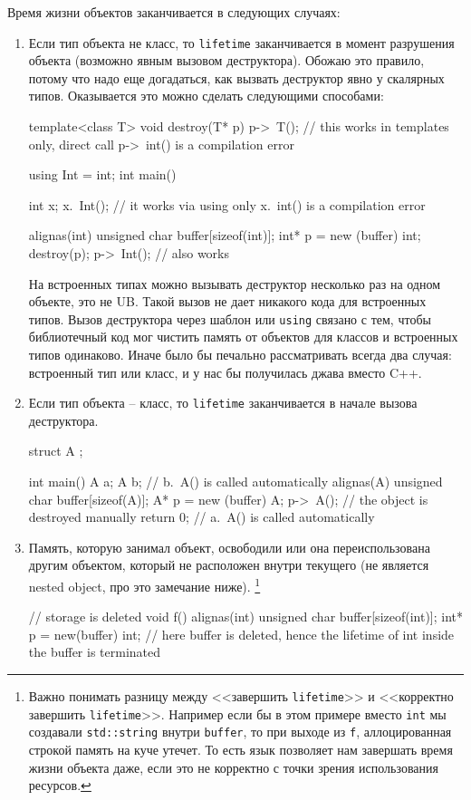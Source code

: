 \documentclass{article}
\begin{document}
Время жизни объектов заканчивается в следующих случаях:
\begin{enumerate}
\item Если тип объекта не класс, то \verb"lifetime" заканчивается в момент разрушения объекта (возможно явным вызовом деструктора).
Обожаю это правило, потому что надо еще догадаться, как вызвать деструктор явно у скалярных типов.
Оказывается это можно сделать следующими способами:
\begin{cppcode}[\nonumbers]
template<class T>
void destroy(T* p) {
  p->~T(); // this works in templates only, direct call p->~int() is a compilation error
}

using Int = int;
int main() {
  int x;
  x.~Int(); // it works via using only x.~int() is a compilation error
  
  alignas(int) unsigned char buffer[sizeof(int)];
  int* p = new (buffer) int;
  destroy(p);
  p->~Int(); // also works
}
\end{cppcode}
На встроенных типах можно вызывать деструктор несколько раз на одном объекте, это не UB.
Такой вызов не дает никакого кода для встроенных типов.
Вызов деструктора через шаблон или \verb"using" связано с тем, чтобы библиотечный код мог чистить память от объектов для классов и встроенных типов одинаково.
Иначе было бы печально рассматривать всегда два случая: встроенный тип или класс, и у нас бы получилась джава вместо C++.

\item Если тип объекта -- класс, то \verb"lifetime" заканчивается в начале вызова деструктора.
\begin{cppcode}[\nonumbers]
struct A {};

int main() {
  A a;
  {
    A b;
  } // b.~A() is called automatically
  alignas(A) unsigned char buffer[sizeof(A)];
  A* p = new (buffer) A;
  p->~A(); // the object is destroyed manually
  return 0;
} // a.~A() is called automatically
\end{cppcode}

\item Память, которую занимал объект, освободили или она переиспользована другим объектом, который не расположен внутри текущего (не является nested object, про это замечание ниже).%
\footnote{Важно понимать разницу между <<завершить \verb"lifetime">> и <<корректно завершить \verb"lifetime">>.
Например если бы в этом примере вместо \verb"int" мы создавали \verb"std::string" внутри \verb"buffer", то при выходе из \verb"f", аллоцированная строкой память на куче утечет.
То есть язык позволяет нам завершать время жизни объекта даже, если это не корректно с точки зрения использования ресурсов.}
\begin{cppcode}[\nonumbers]
// storage is deleted
void f() {
  alignas(int) unsigned char buffer[sizeof(int)];
  int* p = new(buffer) int;
} // here buffer is deleted, hence the lifetime of int inside the buffer is terminated


\end{cppcode}
\end{enumerate}
\end{document}
